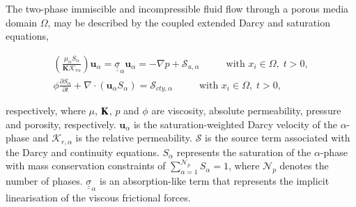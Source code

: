 \documentclass[preprint,authoryear,12pt]{elsarticle}
\begin{document}

The two-phase immiscible and incompressible fluid flow through a porous media domain $\Omega$, may be described by the coupled extended Darcy and saturation equations,

\begin{eqnarray}
\left(\displaystyle\frac{\mu_{\alpha}S_{\alpha}}{{\mathbf K}\mathcal{K}_{r\alpha}}\right) {\mathbf u}_{\alpha} = \underline{\underline{\sigma}}_{\alpha} {\mathbf u}_{\alpha} = -\nabla p + \mathcal{S}_{u,\alpha}\hspace{1cm} \text{ with } x_{i}\in\Omega,\; t>0, \label{eqn:darcy_eqn} \\
\phi\displaystyle\frac{\partial S_{\alpha} }{\partial t} +   \nabla \cdot \left( {\mathbf u}_{\alpha}  S_{\alpha}\right) =  \mathcal{S}_{cty,\alpha}\hspace{1cm} \text{ with } x_{i}\in\Omega,\; t>0,\label{eqn:saturation_eqn}
\end{eqnarray} 

\noindent respectively, where $\mu$, ${\bf K}$, $p$ and $\phi$ are viscosity, absolute permeability, pressure and porosity, respectively. ${\mathbf u}_{\alpha}$ is the saturation-weighted Darcy velocity of the $\alpha$-phase and $\mathcal{K}_{r,\alpha}$ is the relative permeability. $\mathcal{S}$ is the source term associated with the Darcy and continuity equations. $S_{\alpha}$ represents the saturation of the $\alpha$-phase with mass conservation constraints of $\sum\limits_{\alpha=1}^{\mathcal{N}_{p}} S_{\alpha} = 1$, where $\mathcal{N}_{p}$ denotes the number of phases. $\underline{\underline{\sigma}}_{\alpha}$ is an absorption-like term that represents the implicit linearisation of the viscous frictional forces.
\end{document}
